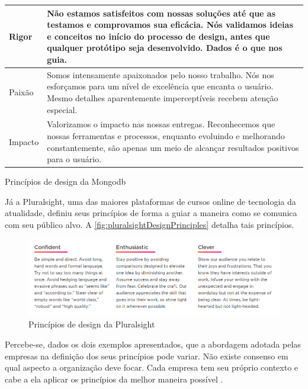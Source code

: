 \begin{quadro}[!htb]
\begin{tabular}{|m{2cm}|m{12cm}|}
		 Rigor & Não estamos satisfeitos com nossas soluções até que as testamos e comprovamos sua eficácia. Nós validamos ideias e conceitos no início do processo de design, antes que  qualquer protótipo seja desenvolvido. Dados é o que nos guia. \\\hline
		 
		 Paixão & Somos intensamente apaixonados pelo nosso trabalho. Nós nos esforçamos para um nível de excelência que encanta o usuário. Mesmo detalhes aparentemente imperceptíveis recebem atenção especial. \\\hline
		 
		 Impacto & Valorizamos o impacto nas nossas entregas. Reconhecemos que nossas ferramentas e processos, enquanto evoluindo e melhorando constantemente, são apenas um meio de alcançar resultados positivos para o usuário. \\\hline
			
	\end{tabular}
	\caption{Princípios de design da Mongodb}
	\label{table:mongodbDesignPrinciples}
\end{quadro}

Já a Pluralsight, uma das maiores plataformas de cursos online de tecnologia da atualidade, definiu seus princípios de forma a guiar a maneira como se comunica com seu público alvo. A \autoref{fig:pluralsightDesignPrinciples} detalha tais princípios.

\begin{figure}
	\includegraphics[width=\linewidth]{./04-figuras/02_referencial_teorico/pluralsight-principles.png}
	\caption{Princípios de design da Pluralsight}
  \label{fig:pluralsightDesignPrinciples}
\end{figure}

Percebe-se, dados os dois exemplos apresentados, que a abordagem adotada pelas empresas na definição dos seus princípios pode variar. Não existe consenso em qual aspecto a organização deve focar. Cada empresa tem seu próprio contexto e cabe a ela aplicar os princípios da melhor maneira possível \cite{kholmatova2017design}.

